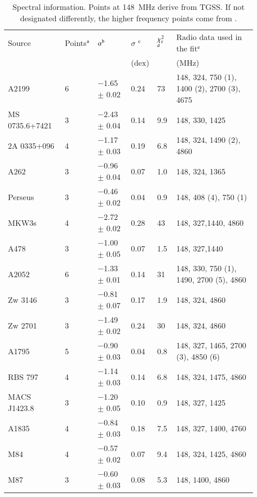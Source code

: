 \documentclass{aa}  %
\begin{document}
\begin{table*}[ht]
	\begin{center}
	\caption{Spectral information. Points at 148~MHz derive from TGSS. If not designated differently, the higher frequency points come from \cite{Birzan2008}. 
	}
	\begin{tabular}{l l l l l l}
		\hline
		\hline
		Source		 		& Points$\rm{^a}$	& $\alpha\rm{^b}$ 			& $\sigma$ $\rm{^c}$ 	& $\chi^{2}_{\rm{r}}$ $\rm{^d}$  & Radio data used in the fit$\rm{^e}$\\
								&							&				 					&			(dex)				&	   		 								  &			(MHz)					\\
		\hline		
		A2199					& 6			&	$-$1.65 $\pm$ 0.02	&	0.24	&	73		&				 	148, 324, 750 (1), 1400 (2), 2700 (3), 4675\\
		MS 0735.6+7421	& 3			&	$-$2.43 $\pm$ 0.04	&	0.14	&	9.9	&					148, 330, 1425\\
		2A 0335+096			& 4			&	$-$1.17 $\pm$ 0.03	&	0.19	&	6.8	&					148, 324, 1490 (2), 4860\\
		A262						& 3			&	$-$0.96 $\pm$ 0.04	&	0.07	&	1.0	&					148, 324, 1365\\
		Perseus					& 3			& 	$-$0.46 $\pm$ 0.02	&	0.04	&	0.9	&					148, 408 (4), 750 (1)\\
		MKW3s					& 4			&	$-$2.72 $\pm$ 0.02	&	0.28	&	43		&					148, 327,1440, 4860\\
		A478						& 3			&	$-$1.00 $\pm$ 0.05	&	0.07	&	1.5	&				 	148, 327,1440\\ 
		A2052					& 6			&	$-$1.33 $\pm$ 0.01	&	0.14	&	31		&					148, 330, 750 (1), 1490, 2700 (5), 4860\\
		Zw 3146				& 3			&	$-$0.81 $\pm$ 0.07	&	0.17	&	1.9	&					148, 324, 4860\\		
		Zw 2701				& 3			&	$-$1.49 $\pm$ 0.02	&	0.24	&	30		&					148, 324, 4860\\  	
		A1795					& 5			&	$-$0.90 $\pm$ 0.03	&	0.04	&	0.8	&					148, 327, 1465, 2700 (3), 4850 (6)\\
		RBS 797				& 4			&	$-$1.14 $\pm$ 0.03	&	0.14	&	6.8	&					148, 324, 1475, 4860\\ 
		MACS J1423.8		& 3			&	$-$1.20 $\pm$ 0.05	&	0.10	&	0.9	&					148, 327, 1425\\		
		A1835					& 4			&	$-$0.84 $\pm$ 0.03	&	0.18	&	7.5	&					148, 327, 1400, 4760\\
		M84						& 4			&	$-$0.57 $\pm$ 0.02	&	0.07	&	9.4	&					148, 324, 1425, 4860 \\	
		M87						& 3			&  $-$0.60 $\pm$ 0.03    &	0.08	&  5.3  &                    148, 1400, 4860 \\
		

\end{tabular}
\end{center}
\end{table*}
\end{document}
